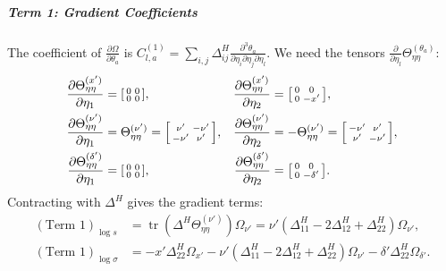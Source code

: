 \documentclass{article}
\begin{document}
\subparagraph{Term 1: Gradient Coefficients}
The coefficient of $\frac{\partial \Omega}{\partial \theta_a}$ is $C^{(1)}_{l,a} = \sum_{i,j} \Delta^H_{ij} \frac{\partial^3 \theta_a}{\partial \eta_i \partial \eta_j \partial \eta_l}$.
We need the tensors $\frac{\partial}{\partial \eta_l} \Theta_{\eta\eta}^{(\theta_a)}$:
%
\begin{align}
  \frac{\partial \Theta_{\eta\eta}^{(x')}}{\partial \eta_1}      & = \begin{bsmallmatrix} 0 & 0 \\ 0 & 0 \end{bsmallmatrix},                              & \frac{\partial \Theta_{\eta\eta}^{(x')}}{\partial \eta_2}      & = \begin{bsmallmatrix} 0 & 0 \\ 0 & -x' \end{bsmallmatrix},                               \\
  \frac{\partial \Theta_{\eta\eta}^{(\nu')}}{\partial \eta_1}    & = \Theta_{\eta\eta}^{(\nu')} = \begin{bsmallmatrix} \nu' & -\nu' \\ -\nu' & \nu' \end{bsmallmatrix}, & \frac{\partial \Theta_{\eta\eta}^{(\nu')}}{\partial \eta_2}    & = -\Theta_{\eta\eta}^{(\nu')} = \begin{bsmallmatrix} -\nu' & \nu' \\ \nu' & -\nu' \end{bsmallmatrix}, \\
  \frac{\partial \Theta_{\eta\eta}^{(\delta')}}{\partial \eta_1} & = \begin{bsmallmatrix} 0 & 0 \\ 0 & 0 \end{bsmallmatrix},                              & \frac{\partial \Theta_{\eta\eta}^{(\delta')}}{\partial \eta_2} & = \begin{bsmallmatrix} 0 & 0 \\ 0 & -\delta' \end{bsmallmatrix}.
\end{align}
%
Contracting with $\Delta^H$ gives the gradient terms:
%
\begin{align}
  (\text{Term 1})_{\log s}      & = \operatorname{tr}(\Delta^H \Theta_{\eta\eta}^{(\nu')}) \Omega_{\nu'} = \nu'(\Delta^H_{11} - 2\Delta^H_{12} + \Delta^H_{22}) \Omega_{\nu'}, \\
  (\text{Term 1})_{\log \sigma} & = -x'\Delta^H_{22}\Omega_{x'} - \nu'(\Delta^H_{11} - 2\Delta^H_{12} + \Delta^H_{22})\Omega_{\nu'} - \delta'\Delta^H_{22}\Omega_{\delta'}.
\end{align}
\end{document}
